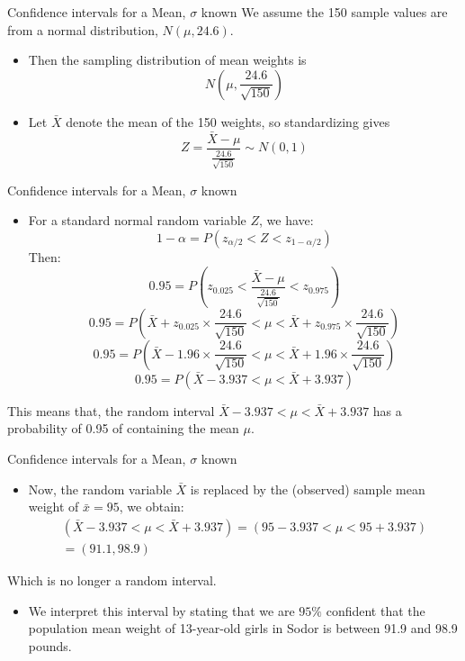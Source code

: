 \documentclass[
  ignorenonframetext,
]{beamer}
\providecommand{\tightlist}{%
  \setlength{\itemsep}{0pt}\setlength{\parskip}{0pt}}
\begin{document}
\begin{frame}{Confidence intervals for a Mean, \(\sigma\) known}
\label{confidence-intervals-for-a-mean-sigma-known-1}
We assume the 150 sample values are from a normal distribution,
\(N(\mu, 24.6)\).

\begin{itemize}
\item
  Then the sampling distribution of mean weights is
  \[N\left(\mu,\frac{24.6}{\sqrt{150}}\right)\]
\item
  Let \(\bar{X}\) denote the mean of the 150 weights, so standardizing
  gives \[Z=\frac{\bar{X}-\mu}{\frac{24.6}{\sqrt{150}}}\sim N(0,1)\]
\end{itemize}
\end{frame}

\begin{frame}{Confidence intervals for a Mean, \(\sigma\) known}
\label{confidence-intervals-for-a-mean-sigma-known-2}
\begin{itemize}
\tightlist
\item
  For a standard normal random variable \(Z\), we have:
  \[1-\alpha=P(z_{\alpha/2}<Z<z_{1-\alpha/2})\] Then:
  \[0.95=P\left(z_{0.025}<\frac{\bar{X}-\mu}{\frac{24.6}{\sqrt{150}}}<z_{0.975}\right)\]
  \[0.95=P\left(\bar{X}+z_{0.025}\times\frac{24.6}{\sqrt{150}}<\mu<\bar{X}+z_{0.975}\times\frac{24.6}{\sqrt{150}}\right)\]
  \[0.95=P\left(\bar{X}-1.96\times\frac{24.6}{\sqrt{150}}<\mu<\bar{X}+1.96\times\frac{24.6}{\sqrt{150}}\right)\]
  \[0.95=P(\bar{X}-3.937<\mu<\bar{X}+3.937)\]
\end{itemize}

This means that, the random interval \(\bar{X}-3.937<\mu<\bar{X}+3.937\)
has a probability of 0.95 of containing the mean \(\mu\).
\end{frame}

\begin{frame}{Confidence intervals for a Mean, \(\sigma\) known}
\label{confidence-intervals-for-a-mean-sigma-known-3}
\begin{itemize}
\tightlist
\item
  Now, the random variable \(\bar{X}\) is replaced by the (observed)
  sample mean weight of \(\bar{x}=95\), we obtain: \[\begin{array}{ll}
  (\bar{X}-3.937<\mu<\bar{X}+3.937)=(95-3.937<\mu<95+3.937)\\
  =(91.1, 98.9)\end{array}\]
\end{itemize}

Which is no longer a random interval.

\begin{itemize}
\tightlist
\item
  We interpret this interval by stating that we are \(95\%\) confident
  that the population mean weight of 13-year-old girls in Sodor is
  between 91.9 and 98.9 pounds.
\end{itemize}
\end{frame}
\end{document}
